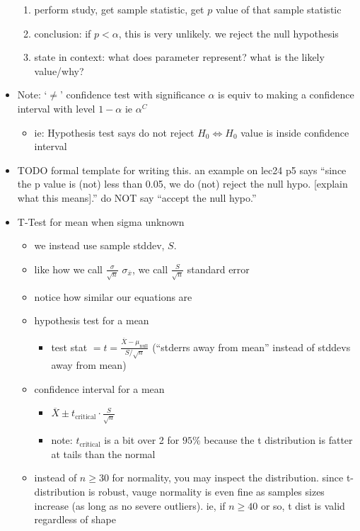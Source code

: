 \documentclass[11pt]{article}
\begin{document}
\begin{itemize}
\begin{enumerate}
    \item perform study, get sample statistic, get $p$ value of that sample statistic
    \item conclusion: if $p < \alpha$, this is very unlikely. we reject the null hypothesis
    \item state in context: what does parameter represent? what is the likely value/why?
  \end{enumerate}
  \item Note: `$\ne$' confidence test with significance $\alpha$ is equiv to making a confidence interval with level $1-\alpha$ ie $\alpha^C$
  \begin{itemize}
    \item ie: Hypothesis test says do not reject $H_0 \Leftrightarrow H_0$ value is inside confidence interval
  \end{itemize}
  \item TODO formal template for writing this. an example on lec24 p5 says ``since the p value is (not) less than 0.05, we do (not) reject the null hypo. [explain what this means].'' do NOT say ``accept the null hypo.''
  \newpage
  \item T-Test for mean when sigma unknown
  \begin{itemize}
    \item we instead use sample stddev, $S$.
    \item like how we call $\frac{\sigma}{\sqrt{n}}$ $\sigma_{\overline{x}}$, we call $\frac{S}{\sqrt{n}}$ standard error
    \item notice how similar our equations are
    \item hypothesis test for a mean
    \begin{itemize}
      \item test stat $= t = \frac{\overline{X}-\mu_{\text{null}}}{S / \sqrt{n}}$ (``stderrs away from mean'' instead of stddevs away from mean)
    \end{itemize}
    \item confidence interval for a mean
    \begin{itemize}
      \item $\overline{X} \pm t_{\text{critical}}\cdot \frac{S}{\sqrt{n}}$
      \item note: $t_{\text{critical}}$ is a bit over 2 for $95\%$ because the t distribution is fatter at tails than the normal
    \end{itemize}
    \item instead of $n\ge 30$ for normality, you may inspect the distribution. since t-distribution is robust, vauge normality is even fine as samples sizes increase (as long as no severe outliers). ie, if $n\ge 40$ or so, t dist is valid regardless of shape

\end{itemize}
\end{itemize}
\end{document}
